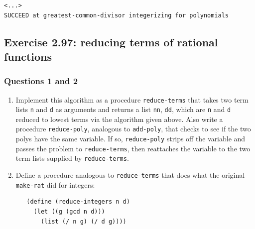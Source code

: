\documentclass[final,fleqn,titlepage,twoside]{article}
\begin{document}
\begin{verbatim}
<...>
SUCCEED at greatest-common-divisor integerizing for polynomials
\end{verbatim}

\subsection{Exercise 2.97: reducing terms of rational functions}
\label{sec:org70d9ab5}

\subsubsection{Questions 1 and 2}
\label{sec:orgfd269e9}

\begin{enumerate}
\item Implement this algorithm as a procedure \texttt{reduce-terms} that takes
two term lists \texttt{n} and \texttt{d} as arguments and returns a
list \texttt{nn}, \texttt{dd}, which are \texttt{n} and
\texttt{d} reduced to lowest terms via the algorithm given above. Also
write a procedure \texttt{reduce-poly}, analogous to \texttt{add-poly},
that checks to see if the two polys have the same variable. If so,
\texttt{reduce-poly} strips off the variable and passes the problem to
\texttt{reduce-terms}, then reattaches the variable to the two term lists
supplied by \texttt{reduce-terms}.

\item Define a procedure analogous to \texttt{reduce-terms} that does what the
original \texttt{make-rat} did for integers:

\begin{verbatim}
   (define (reduce-integers n d)
     (let ((g (gcd n d)))
       (list (/ n g) (/ d g))))
\end{verbatim}


\end{enumerate}
\end{document}
